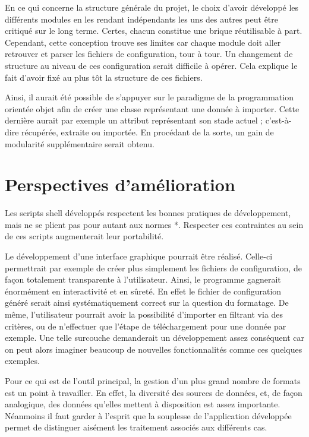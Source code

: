 En ce qui concerne la structure générale du projet, le choix d'avoir développé les différents modules en les rendant indépendants les uns des autres peut être critiqué sur le long terme. Certes, chacun constitue une brique réutilisable à part. Cependant, cette conception trouve ses limites car chaque module doit aller retrouver et parser les fichiers de configuration, tour à tour. Un changement de structure au niveau de ces configuration serait difficile à opérer. Cela explique le fait d'avoir fixé au plus tôt la structure de ces fichiers.

Ainsi, il aurait été possible de s'appuyer sur le paradigme de la programmation orientée objet afin de créer une classe représentant une donnée à importer. Cette dernière aurait par exemple un attribut représentant son stade actuel ; c'est-à-dire récupérée, extraite ou importée. En procédant de la sorte, un gain de modularité supplémentaire serait obtenu.

\section*{Perspectives d'amélioration}

Les scripts shell développés respectent les bonnes pratiques de développement, mais ne se plient pas pour autant aux normes *. Respecter ces contraintes au sein de ces scripts augmenterait leur portabilité.

Le développement d'une interface graphique pourrait être réalisé. Celle-ci permettrait par exemple de créer plus simplement les fichiers de configuration, de façon totalement transparente à l'utilisateur. Ainsi, le programme gagnerait énormément en interactivité et en sûreté. En effet le fichier de configuration généré serait ainsi systématiquement correct sur la question du formatage. De même, l'utilisateur pourrait avoir la possibilité d'importer en filtrant via des critères, ou de n'effectuer que l'étape de téléchargement pour une donnée par exemple. Une telle surcouche demanderait un développement assez conséquent car on peut alors imaginer beaucoup de nouvelles fonctionnalités comme ces quelques exemples.

Pour ce qui est de l'outil principal, la gestion d'un plus grand nombre de formats est un point à travailler. En effet, la diversité des sources de données, et, de façon analogique, des données qu'elles mettent à disposition est assez importante. Néanmoins il faut garder à l'esprit que la souplesse de l'application développée permet de distinguer aisément les traitement associés aux différents cas.

